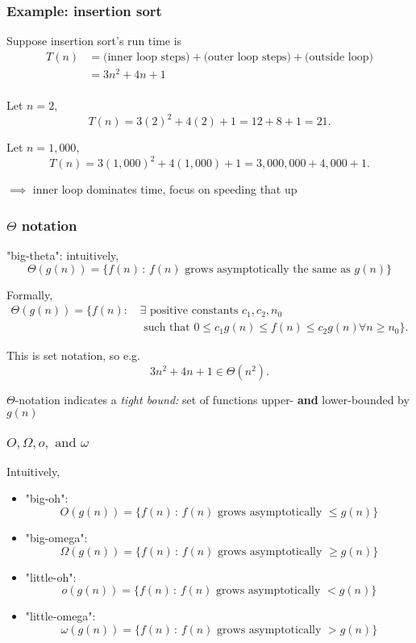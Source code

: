 \documentclass{beamer}
\begin{document}
\begin{frame} \frametitle{Example: insertion sort}

Suppose insertion sort's run time is
\begin{align*}
  T(n) &= \text{(inner loop steps)} + \text{(outer loop steps)} + \text{(outside loop)} \\
  &= 3n^2 + 4n + 1 \\
\end{align*}

Let $n=2,$
\[ T(n) = 3(2)^2 + 4(2) + 1 = 12 + 8 + 1 = 21 .\]

Let $n=1,000,$
\[ T(n) = 3(1,000)^2 + 4(1,000) + 1 = 3,000,000 + 4,000 + 1 . \]

$\implies$ inner loop dominates time, focus on speeding that up

\end{frame}

\begin{frame} \frametitle{$\Theta$ notation}
"big-theta": intuitively,
\[ \Theta(g(n)) = \{ f(n) \,:\, f(n)
  \text{ grows asymptotically the same as } g(n) \} \]

Formally,
\begin{align*}
  \Theta(g(n)) = \{ f(n) :\, & \exists \text{ positive constants } c_1, c_2, n_0 \\
   & \text{ such that } 0 \leq c_1 g(n) \leq f(n) \leq c_2 g(n)
   & \forall n \geq n_0 \} .
\end{align*}

This is set notation, so e.g.
\[ 3n^2 + 4n + 1 \in \Theta(n^2) . \]

$\Theta$-notation indicates a \emph{tight bound:} set of functions upper-
\textbf{and} lower-bounded by $g(n)$

\end{frame}

\begin{frame} \frametitle{$O, \Omega, o, \text{ and } \omega$}
Intuitively,
\begin{itemize}
  \item "big-oh": \[ O(g(n)) = \{ f(n) \,:\, f(n)
    \text{ grows asymptotically } \leq  g(n) \} \]
  \item "big-omega": \[ \Omega(g(n)) = \{ f(n) \,:\, f(n)
    \text{ grows asymptotically } \geq  g(n) \} \]
  \item "little-oh": \[ o(g(n)) = \{ f(n) \,:\, f(n)
    \text{ grows asymptotically } <  g(n) \} \]
  \item "little-omega": \[ \omega(g(n)) = \{ f(n) \,:\, f(n)
    \text{ grows asymptotically } >  g(n) \} \]
 \end{itemize}
\end{frame}
\end{document}
